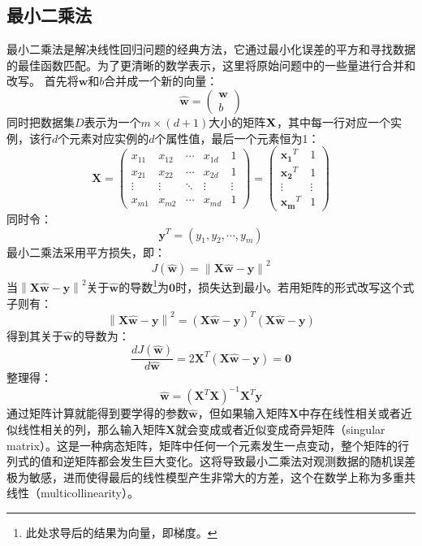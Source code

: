 \documentclass[12pt,a4paper,draft]{ctexart}
\begin{document}
\subsection{最小二乘法}
最小二乘法是解决线性回归问题的经典方法，它通过最小化误差的平方和寻找数据的最佳函数匹配。为了更清晰的数学表示，这里将原始问题中的一些量进行合并和改写。
首先将$ \textbf{w} $和$ b $合并成一个新的向量：
\[ \hat{\mathbf{w}}=\begin{pmatrix}
\mathbf{w} \\ 
b
\end{pmatrix}  \]
同时把数据集$ D $表示为一个$ m\times(d+1) $大小的矩阵$ \bf{X} $，其中每一行对应一个实例，该行$ d $个元素对应实例的$ d $个属性值，最后一个元素恒为1：
\[ 
\mathbf{X}=
\begin{pmatrix}
	x_{11} & x_{12} & \cdots & x_{1d} & 1 \\ 
	x_{21} & x_{22} & \cdots & x_{2d} & 1 \\ 
	\vdots & \vdots & \ddots & \vdots & \vdots \\ 
	x_{m1} & x_{m2} & \cdots & x_{md} & 1
\end{pmatrix} =\begin{pmatrix}
\mathbf{x_1}^T & 1 \\ 
\mathbf{x_2}^T & 1 \\ 
\vdots & \vdots \\ 
\mathbf{x_m}^T & 1
\end{pmatrix} 
\]
同时令：
\[ \mathbf{y}^T=(y_1,y_2,\cdots,y_m) \]
最小二乘法采用平方损失，即： 
\[ J(\mathbf{\hat{w}})=\left \| \mathbf{X}\mathbf{\hat{w}}-\mathbf{y} \right \|^{2} \]
当$ \left \| \mathbf{X}\mathbf{\hat{w}}-\mathbf{y} \right \|^{2} $关于$ \hat{\textbf{w}} $的导数\footnote{此处求导后的结果为向量，即梯度。}为$ \textbf{0} $时，损失达到最小。若用矩阵的形式改写这个式子则有： 
\[ \left \| \mathbf{X}\mathbf{\hat{w}}-\mathbf{y} \right \|^{2}=(\mathbf{X}\mathbf{\hat{w}}-\mathbf{y})^T(\mathbf{X}\mathbf{\hat{w}}-\mathbf{y}) \]
得到其关于$ \mathbf{\hat{w}} $的导数为： 
\[ \frac{dJ(\mathbf{\hat{w}})}{d\mathbf{\hat{w}}}=2\textbf{X}^T(\textbf{X}\hat{\textbf{w}}-\textbf{y})=\textbf{0} \]
整理得： 
\[ \hat{\textbf{w}}=(\textbf{X}^T\textbf{X})^{-1}\textbf{X}^T\textbf{y} \]
通过矩阵计算就能得到要学得的参数$ \mathbf{\hat{w}} $，但如果输入矩阵$ \textbf{X} $中存在线性相关或者近似线性相关的列，那么输入矩阵$ \textbf{X} $就会变成或者近似变成奇异矩阵（singular matrix）。这是一种病态矩阵，矩阵中任何一个元素发生一点变动，整个矩阵的行列式的值和逆矩阵都会发生巨大变化。这将导致最小二乘法对观测数据的随机误差极为敏感，进而使得最后的线性模型产生非常大的方差，这个在数学上称为多重共线性（multicollinearity）。
\end{document}
